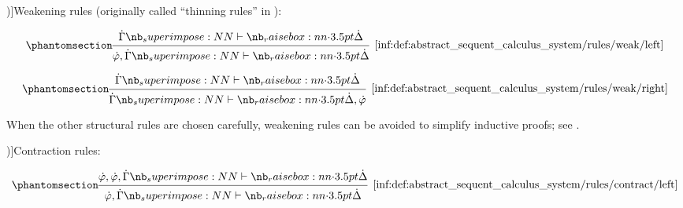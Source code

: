 \begin{definition}
  \begin{thmenum}
     \term[ru=правила добавления (\cite[217]{КолмогоровДрагалин2006Логика})]{Weakening rules} (originally called \enquote{thinning rules} in \cite[296]{Gentzen1964LogicalDeduction}):
    \begin{paracol}{2}
      \begin{leftcolumn}
        \ParacolAlignmentHack
        \begin{equation*}\taglabel[\ensuremath{ \logic{Weak}_L }]{inf:def:abstract_sequent_calculus_system/rules/weak/left}
          \begin{prooftree}
            \hypo{ \syn\Gamma \synvdash \syn\Delta }
            \infer1[\ref{inf:def:abstract_sequent_calculus_system/rules/weak/left}]{ \syn\varphi, \syn\Gamma \synvdash \syn\Delta }
          \end{prooftree}
        \end{equation*}
      \end{leftcolumn}

      \begin{rightcolumn}
        \ParacolAlignmentHack
        \begin{equation*}\taglabel[\ensuremath{ \logic{Weak}_R }]{inf:def:abstract_sequent_calculus_system/rules/weak/right}
          \begin{prooftree}
            \hypo{ \syn\Gamma \synvdash \syn\Delta }
            \infer1[\ref{inf:def:abstract_sequent_calculus_system/rules/weak/right}]{ \syn\Gamma \synvdash \syn\Delta, \syn\varphi }
          \end{prooftree}
        \end{equation*}
      \end{rightcolumn}
    \end{paracol}

    When the other structural rules are chosen carefully, weakening rules can be avoided to simplify inductive proofs; see \cite{CST:weakening_rule_for_lambda_cube}.

     \term[ru=правила сокращения (\cite[218]{КолмогоровДрагалин2006Логика})]{Contraction rules}:
    \begin{paracol}{2}
      \begin{leftcolumn}
        \ParacolAlignmentHack
        \begin{equation*}\taglabel[\ensuremath{ \logic{Contr}_L }]{inf:def:abstract_sequent_calculus_system/rules/contract/left}
          \begin{prooftree}
            \hypo{ \syn\varphi, \syn\varphi, \syn\Gamma \synvdash \syn\Delta }
            \infer1[\ref{inf:def:abstract_sequent_calculus_system/rules/contract/left}]{ \syn\varphi, \syn\Gamma \synvdash \syn\Delta }
          \end{prooftree}
        \end{equation*}
      \end{leftcolumn}


\end{paracol}
\end{thmenum}
\end{definition}
